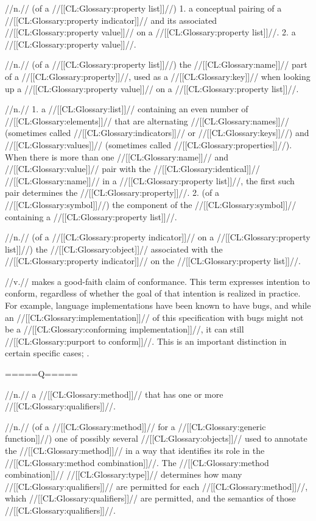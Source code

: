  //n.// (of a //[[CL:Glossary:property list]]//) 1. a conceptual pairing of a //[[CL:Glossary:property indicator]]// and its associated //[[CL:Glossary:property value]]// on a //[[CL:Glossary:property list]]//. 2. a //[[CL:Glossary:property value]]//.

 //n.// (of a //[[CL:Glossary:property list]]//) the //[[CL:Glossary:name]]// part of a //[[CL:Glossary:property]]//, used as a //[[CL:Glossary:key]]// when looking up a //[[CL:Glossary:property value]]// on a //[[CL:Glossary:property list]]//. 
 
 //n.// 
 1. a //[[CL:Glossary:list]]// containing an even number of //[[CL:Glossary:elements]]// that are alternating //[[CL:Glossary:names]]// (sometimes called //[[CL:Glossary:indicators]]// or //[[CL:Glossary:keys]]//) and //[[CL:Glossary:values]]// (sometimes called //[[CL:Glossary:properties]]//). When there is more than one //[[CL:Glossary:name]]// and //[[CL:Glossary:value]]// pair with the //[[CL:Glossary:identical]]// //[[CL:Glossary:name]]// in a //[[CL:Glossary:property list]]//, the first such pair determines the //[[CL:Glossary:property]]//. 2. (of a //[[CL:Glossary:symbol]]//) the component of the //[[CL:Glossary:symbol]]// containing a //[[CL:Glossary:property list]]//.


 //n.// (of a //[[CL:Glossary:property indicator]]// on a //[[CL:Glossary:property list]]//) the //[[CL:Glossary:object]]// associated with the //[[CL:Glossary:property indicator]]// on the //[[CL:Glossary:property list]]//.

 //v.// makes a good-faith claim of conformance. This term expresses intention to conform, regardless of whether the goal of that intention is realized in practice. For example, language implementations have been known to have bugs, and while an //[[CL:Glossary:implementation]]// of this specification with bugs might not be a //[[CL:Glossary:conforming implementation]]//, it can still //[[CL:Glossary:purport to conform]]//. This is an important distinction in certain specific cases; \eg {}.

=====Q=====

 //n.// a //[[CL:Glossary:method]]// that has one or more //[[CL:Glossary:qualifiers]]//.

 //n.// (of a //[[CL:Glossary:method]]// for a //[[CL:Glossary:generic function]]//) one of possibly several //[[CL:Glossary:objects]]// used to annotate the //[[CL:Glossary:method]]// in a way that identifies its role in the //[[CL:Glossary:method combination]]//. The //[[CL:Glossary:method combination]]// //[[CL:Glossary:type]]// determines how many //[[CL:Glossary:qualifiers]]// are permitted for each //[[CL:Glossary:method]]//, which //[[CL:Glossary:qualifiers]]// are permitted, and the semantics of those //[[CL:Glossary:qualifiers]]//.



